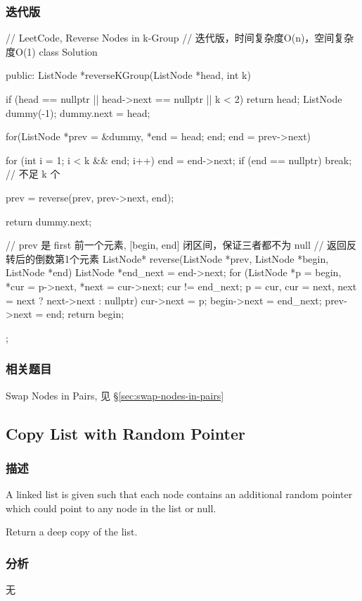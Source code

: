 \subsubsection{迭代版}
\begin{Code}
	// LeetCode, Reverse Nodes in k-Group
	// 迭代版，时间复杂度O(n)，空间复杂度O(1)
	class Solution {
		public:
		ListNode *reverseKGroup(ListNode *head, int k) {
			if (head == nullptr || head->next == nullptr || k < 2) return head;
			ListNode dummy(-1);
			dummy.next = head;
			
			for(ListNode *prev = &dummy, *end = head; end; end = prev->next) {
				for (int i = 1; i < k && end; i++)
				end = end->next;
				if (end  == nullptr) break;  // 不足 k 个
				
				prev = reverse(prev, prev->next, end);
			}
			
			return dummy.next;
		}
		
		// prev 是 first 前一个元素, [begin, end] 闭区间，保证三者都不为 null
		// 返回反转后的倒数第1个元素
		ListNode* reverse(ListNode *prev, ListNode *begin, ListNode *end) {
			ListNode *end_next = end->next;
			for (ListNode *p = begin, *cur = p->next, *next = cur->next;
			cur != end_next;
			p = cur, cur = next, next = next ? next->next : nullptr) {
				cur->next = p;
			}
			begin->next = end_next;
			prev->next = end;
			return begin;
		}
	};
\end{Code}


\subsubsection{相关题目}
\begindot
\item Swap Nodes in Pairs, 见 \S \ref{sec:swap-nodes-in-pairs}
\myenddot


\subsection{Copy List with Random Pointer}
\label{sec:copy-list-with-random-pointer}


\subsubsection{描述}
A linked list is given such that each node contains an additional random 
pointer which could point to any node in the list or null.

Return a deep copy of the list.


\subsubsection{分析}
无


